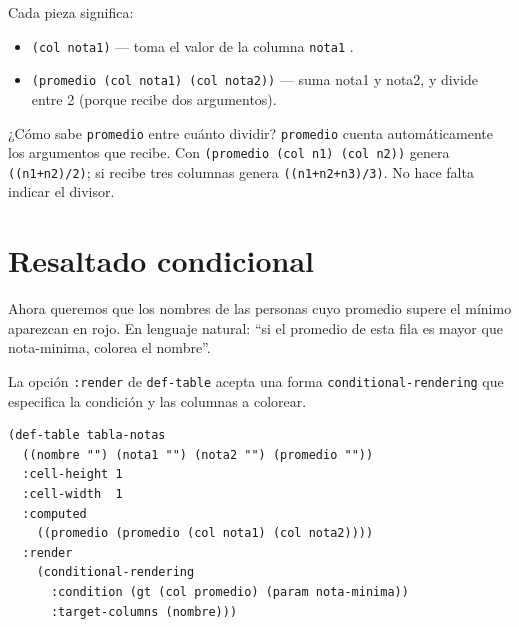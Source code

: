 \documentclass[12pt,a4paper]{report}
\begin{document}
\noindent Cada pieza significa:

\begin{itemize}
  \item \texttt{(col nota1)} --- toma el valor de la columna
    \texttt{nota1} .
  \item \texttt{(promedio (col nota1) (col nota2))} --- suma nota1 y
    nota2, y divide entre 2 (porque recibe dos argumentos).
\end{itemize}

\begin{infobox}{¿Cómo sabe \texttt{promedio} entre cuánto dividir?}
  \texttt{promedio} cuenta automáticamente los argumentos que recibe.
  Con \texttt{(promedio (col n1) (col n2))} genera
  \texttt{((n1+n2)/2)}; si recibe tres columnas genera
  \texttt{((n1+n2+n3)/3)}.  No hace falta indicar el divisor.
\end{infobox}




\section{Resaltado condicional}

Ahora queremos que los nombres de las personas cuyo promedio supere el
mínimo aparezcan en rojo.  En lenguaje natural: ``si el promedio de
esta fila es mayor que nota-minima, colorea el nombre''.

La opción \texttt{:render} de \texttt{def-table} acepta una forma
\texttt{conditional-rendering} que especifica la condición y las
columnas a colorear.

\begin{lstlisting}[caption={Tabla con columna calculada y resaltado.}]
(def-table tabla-notas
  ((nombre "") (nota1 "") (nota2 "") (promedio ""))
  :cell-height 1
  :cell-width  1
  :computed
    ((promedio (promedio (col nota1) (col nota2))))
  :render
    (conditional-rendering
      :condition (gt (col promedio) (param nota-minima))
      :target-columns (nombre)))
\end{lstlisting}
\end{document}
